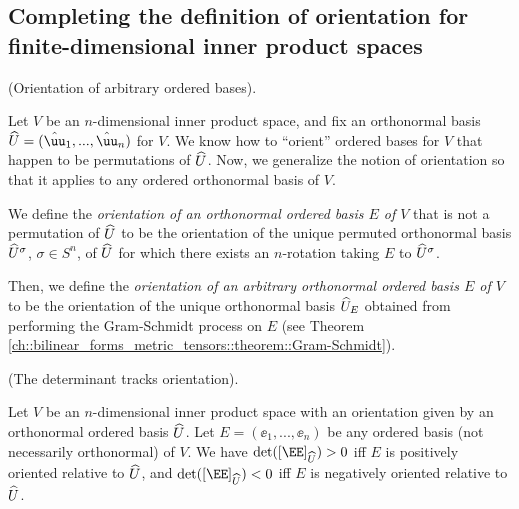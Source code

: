 \subsection*{Completing the definition of orientation for finite-dimensional inner product spaces}

\begin{defn}
    (Orientation of arbitrary ordered bases).
    
    Let $V$ be an $n$-dimensional inner product space, and fix an orthonormal basis $\hU = (\huu_1, ..., \huu_n)$ for $V$. We know how to ``orient'' ordered bases for $V$ that happen to be permutations of $\widehat{U}$. Now, we generalize the notion of orientation so that it applies to any ordered orthonormal basis of $V$.
    
    We define the \textit{orientation of an orthonormal ordered basis $E$ of $V$} that is not a permutation of $\widehat{U}$ to be the orientation of the unique permuted orthonormal basis $\widehat{U}^\sigma$, $\sigma \in S^n$, of $\widehat{U}$ for which there exists an $n$-rotation taking $E$ to $\widehat{U}^\sigma$.
    
    Then, we define the \textit{orientation of an arbitrary orthonormal ordered basis $E$ of $V$} to be the orientation of the unique orthonormal basis $\widehat{U}_E$ obtained from performing the Gram-Schmidt process on $E$ (see Theorem \ref{ch::bilinear_forms_metric_tensors::theorem::Gram-Schmidt}).
\end{defn}

\begin{theorem}
\label{ch::exterior_pwrs::thm::det_tracks_orientation}
    (The determinant tracks orientation). 
    
    Let $V$ be an $n$-dimensional inner product space with an orientation given by an orthonormal ordered basis $\widehat{U}$. Let $E = (\ee_1, ..., \ee_n)$ be any ordered basis (not necessarily orthonormal) of $V$. We have $\det([\EE]_{\hU}) > 0$ iff $E$ is positively oriented relative to $\widehat{U}$, and $\det([\EE]_{\hU}) < 0$ iff $E$ is negatively oriented relative to $\widehat{U}$.
\end{theorem}

